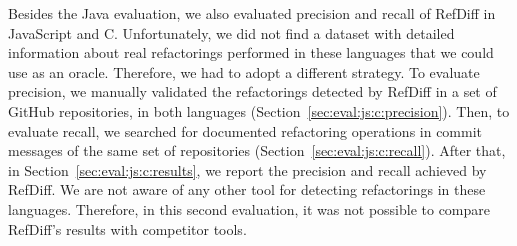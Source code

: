 Besides the Java evaluation, we also evaluated precision and recall of RefDiff in JavaScript and C. Unfortunately, we did not find a dataset with detailed information about real refactorings performed in these languages that we could use as an oracle.
Therefore, we had to adopt a different strategy. 
To evaluate precision, we manually validated the refactorings detected by RefDiff in a set of GitHub repositories, in both languages (Section~\ref{sec:eval:js:c:precision}). Then, to evaluate recall, we searched for documented refactoring operations in commit messages of the same set of repositories (Section~\ref{sec:eval:js:c:recall}).
After that, in Section~\ref{sec:eval:js:c:results}, we report the precision and recall achieved by RefDiff.  We are not aware of any other tool for detecting refactorings in these languages. Therefore, in this second evaluation, it was not possible to compare RefDiff's results with competitor tools.


